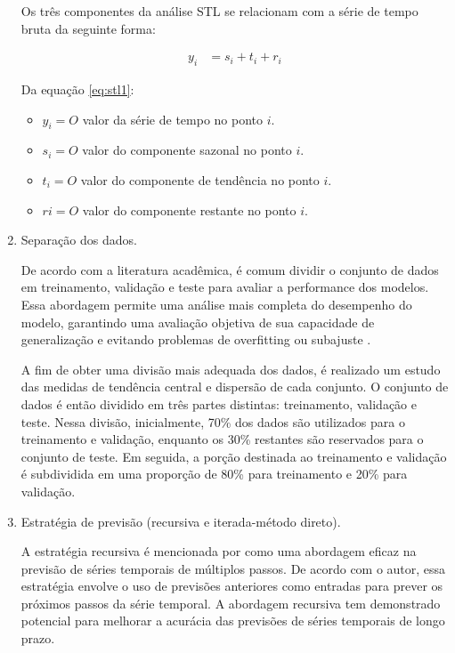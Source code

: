 \begin{enumerate}[start=1, label = {\textbf{Etapa} \arabic*} ]
        Os três componentes da análise STL se relacionam com a série de tempo bruta da seguinte forma:
        
        \begin{align}
        	y_i &= s_i + t_i + r_i\label{eq:stl1}
        \end{align}
    	
    	Da equação \eqref{eq:stl1}:
    	
    	\begin{itemize}
    		\item $y_i = O$ valor da série de tempo no ponto $i$.
    		\item $s_i = O$ valor do componente sazonal no ponto $i$.
    		\item $t_i = O$ valor do componente de tendência no ponto $i$.
    		\item $ri = O$ valor do componente restante no ponto $i$.
    	\end{itemize}
    	\item \label{etp:4} Separação dos dados.
    	
  
    De acordo com a literatura acadêmica, é comum dividir o conjunto de dados em treinamento, validação e teste para avaliar a performance dos modelos. Essa abordagem permite uma análise mais completa do desempenho do modelo, garantindo uma avaliação objetiva de sua capacidade de generalização e evitando problemas de overfitting ou subajuste \cite{cruz-ramirez2020enhancing,mokhtari2020deep,khan2021hybrid,sharma2021deep}.
    
    A fim de obter uma divisão mais adequada dos dados, é realizado um estudo das medidas de tendência central e dispersão de cada conjunto. O conjunto de dados é então dividido em três partes distintas: treinamento, validação e teste. Nessa divisão, inicialmente, 70\% dos dados são utilizados para o treinamento e validação, enquanto os 30\% restantes são reservados para o conjunto de teste. Em seguida, a porção destinada ao treinamento e validação é subdividida em uma proporção de 80\% para treinamento e 20\% para validação.
    	
    	
    	\item Estratégia de previsão (recursiva e iterada-método direto). \label{etp:5}
    	
    	A estratégia recursiva é mencionada por  como uma abordagem eficaz na previsão de séries temporais de múltiplos passos. De acordo com o autor, essa estratégia envolve o uso de previsões anteriores como entradas para prever os próximos passos da série temporal. A abordagem recursiva tem demonstrado potencial para melhorar a acurácia das previsões de séries temporais de longo prazo.
    	

\end{enumerate}
